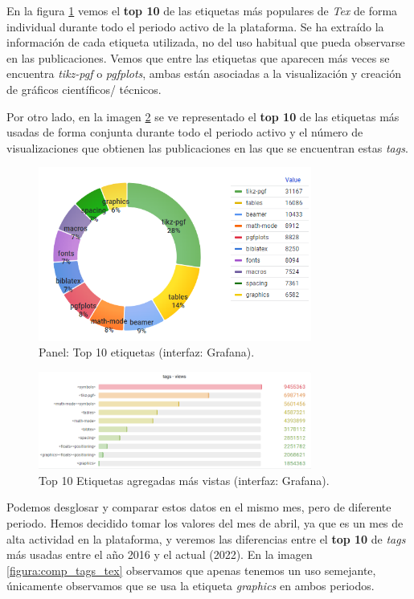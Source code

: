 \documentclass[a4paper, 12pt]{book}
\begin{document}
En la figura \ref{figura:top10_tags_tex} vemos el \textbf{top 10} de las etiquetas más populares de \emph{Tex} de forma individual durante todo el periodo activo de la plataforma. Se ha extraído la información de cada etiqueta utilizada, no del uso habitual que pueda observarse en las publicaciones. Vemos que entre las etiquetas que aparecen más veces se encuentra \emph{tikz-pgf} o \emph{pgfplots}, ambas están asociadas a la visualización y creación de gráficos científicos/ técnicos. 

Por otro lado, en la imagen \ref{figura:evo_tags_tex} se ve representado el \textbf{top 10} de las etiquetas más usadas de forma conjunta durante todo el periodo activo y el número de visualizaciones que obtienen las publicaciones en las que se encuentran estas \emph{tags}. 

\begin{figure}[ht]
    \centering
    \includegraphics[width=0.8\textwidth]{img/tex/tags_evo_tex.png}
    \caption{Panel: Top 10 etiquetas (interfaz: Grafana).}
    \label{figura:top10_tags_tex}
\end{figure}

\begin{figure}[ht]
    \centering
    \includegraphics[width=0.8\textwidth]{img/tex/evo_tags_tex.png}
    \caption{Top 10 Etiquetas agregadas más vistas (interfaz: Grafana).}
    \label{figura:evo_tags_tex}
\end{figure}

Podemos desglosar y comparar estos datos en el mismo mes, pero de diferente periodo. Hemos decidido tomar los valores del mes de abril, ya que es un mes de alta actividad en la plataforma, y veremos las diferencias entre el \textbf{top 10} de \emph{tags} más usadas entre el año 2016 y el actual (2022). En la imagen \ref{figura:comp_tags_tex} observamos que apenas tenemos un uso semejante, únicamente observamos que se usa la etiqueta \emph{graphics} en ambos periodos.
\end{document}
